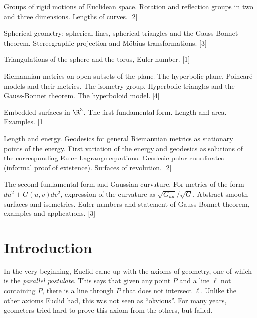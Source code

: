 \documentclass[a4paper]{article}
\begin{document}
\maketitle
{\small
\noindent Groups of rigid motions of Euclidean space. Rotation and reflection groups in two and three dimensions. Lengths of curves.\hspace*{\fill} [2]

\vspace{5pt}
\noindent Spherical geometry: spherical lines, spherical triangles and the Gauss-Bonnet theorem. Stereographic projection and M\"obius transformations.\hspace*{\fill} [3]

\vspace{5pt}
\noindent Triangulations of the sphere and the torus, Euler number.\hspace*{\fill} [1]

\vspace{5pt}
\noindent Riemannian metrics on open subsets of the plane. The hyperbolic plane. Poincar\'e models and their metrics. The isometry group. Hyperbolic triangles and the Gauss-Bonnet theorem. The hyperboloid model.\hspace*{\fill} [4]

\vspace{5pt}
\noindent Embedded surfaces in $\R^3$. The first fundamental form. Length and area. Examples.\hspace*{\fill} [1]

\vspace{5pt}
\noindent Length and energy. Geodesics for general Riemannian metrics as stationary points of the energy. First variation of the energy and geodesics as solutions of the corresponding Euler-Lagrange equations. Geodesic polar coordinates (informal proof of existence). Surfaces of revolution.\hspace*{\fill} [2]

\vspace{5pt}
\noindent The second fundamental form and Gaussian curvature. For metrics of the form $du^2 + G(u, v) dv^2$, expression of the curvature as $\sqrt{G_{uu}}/\sqrt{G}$. Abstract smooth surfaces and isometries. Euler numbers and statement of Gauss-Bonnet theorem, examples and applications.\hspace*{\fill} [3]}

\tableofcontents
\setcounter{section}{-1}
\section{Introduction}
In the very beginning, Euclid came up with the axioms of geometry, one of which is the \emph{parallel postulate}. This says that given any point $P$ and a line $\ell$ not containing $P$, there is a line through $P$ that does not intersect $\ell$. Unlike the other axioms Euclid had, this was not seen as ``obvious''. For many years, geometers tried hard to prove this axiom from the others, but failed.
\end{document}
